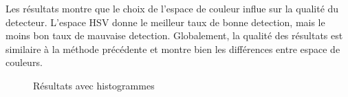 \documentclass{article}
\begin{document}
Les résultats montre que le choix de l'espace de couleur influe sur la qualité du detecteur. L'espace HSV donne le meilleur taux de bonne detection, mais le moins bon taux de mauvaise detection. Globalement, la qualité des résultats est similaire à la méthode précédente et montre bien les différences entre espace de couleurs.

\newpage
\begin{figure}[h!]
  \centering

  \caption{Résultats avec histogrammes}
\end{figure}
\end{document}
